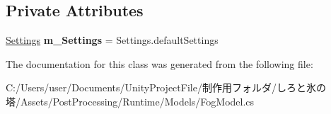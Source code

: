 \subsection*{Private Attributes}
\begin{DoxyCompactItemize}
\item 
\mbox{\label{class_unity_engine_1_1_post_processing_1_1_fog_model_a53731991fbd1ad53793f4dbea503f476}} 
\hyperlink{struct_unity_engine_1_1_post_processing_1_1_fog_model_1_1_settings}{Settings} {\bfseries m\+\_\+\+Settings} = Settings.\+default\+Settings
\end{DoxyCompactItemize}


The documentation for this class was generated from the following file\+:\begin{DoxyCompactItemize}
\item 
C\+:/\+Users/user/\+Documents/\+Unity\+Project\+File/制作用フォルダ/しろと氷の塔/\+Assets/\+Post\+Processing/\+Runtime/\+Models/Fog\+Model.\+cs\end{DoxyCompactItemize}

